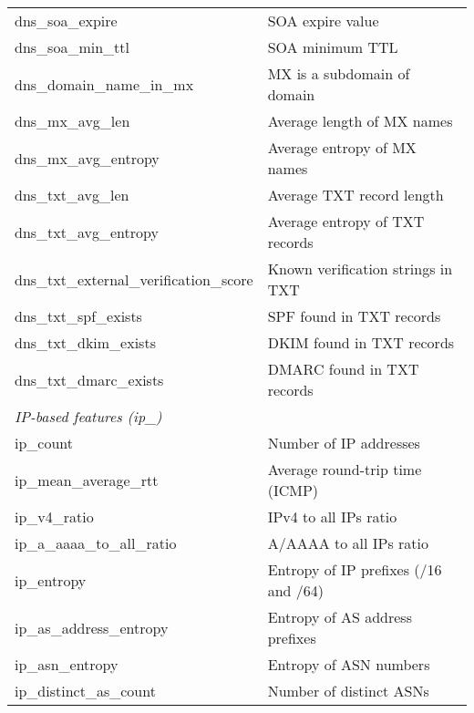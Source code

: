 \begin{longtable}{@{}ll@{}}
dns\_soa\_expire & SOA expire value \\
dns\_soa\_min\_ttl & SOA minimum TTL \\
dns\_domain\_name\_in\_mx & MX is a subdomain of domain \\
dns\_mx\_avg\_len & Average length of MX names \\
dns\_mx\_avg\_entropy & Average entropy of MX names \\
dns\_txt\_avg\_len & Average TXT record length \\
dns\_txt\_avg\_entropy & Average entropy of TXT records \\
dns\_txt\_external\_verification\_score & Known verification strings in TXT \\
dns\_txt\_spf\_exists & SPF found in TXT records \\
dns\_txt\_dkim\_exists & DKIM found in TXT records \\
dns\_txt\_dmarc\_exists & DMARC found in TXT records \\

\midrule
\multicolumn{2}{l}{\emph{IP-based features (ip\_)}} \\
ip\_count & Number of IP addresses \\
ip\_mean\_average\_rtt & Average round-trip time (ICMP) \\
ip\_v4\_ratio & IPv4 to all IPs ratio \\
ip\_a\_aaaa\_to\_all\_ratio & A/AAAA to all IPs ratio \\
ip\_entropy & Entropy of IP prefixes (/16 and /64) \\
ip\_as\_address\_entropy & Entropy of AS address prefixes \\
ip\_asn\_entropy & Entropy of ASN numbers \\
ip\_distinct\_as\_count & Number of distinct ASNs \\


\end{longtable}
